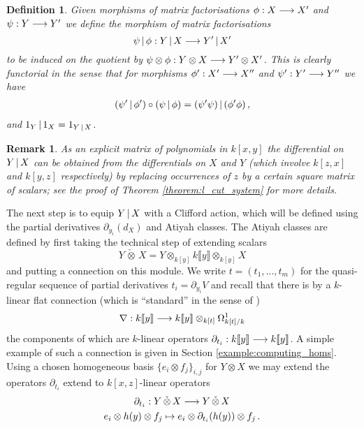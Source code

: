 \documentclass[english,letter paper,12pt,leqno]{article}
\theoremstyle{example}
\newtheorem{definition}[theorem]{Definition}
\newtheorem{remark}[theorem]{Remark}
\numberwithin{equation}{section}
\begin{document}
\begin{definition} Given morphisms of matrix factorisations $\phi: X \longrightarrow X'$ and $\psi: Y \longrightarrow Y'$ we define the morphism of matrix factorisations
\[
\psi \,|\, \phi: Y \,|\, X \longrightarrow Y' \,|\, X'
\]
to be induced on the quotient by $\psi \otimes \phi: Y \otimes X \longrightarrow Y' \otimes X'$. This is clearly functorial in the sense that for morphisms $\phi': X' \longrightarrow X''$ and $\psi': Y' \longrightarrow Y''$ we have
\begin{align}
( \psi' \,|\, \phi' ) \circ ( \psi \,|\, \phi ) = ( \psi' \psi ) \,|\, ( \phi' \phi )\,,
\end{align}
and $1_Y \,|\, 1_X = 1_{Y \,|\, X}$.
\end{definition}

\begin{remark}
As an explicit matrix of polynomials in $k[x,y]$ the differential on $Y \,|\, X$ can be obtained from the differentials on $X$ and $Y$ (which involve $k[z,x]$ and $k[y,z]$ respectively) by replacing occurrences of $z$ by a certain square matrix of scalars; see the proof of Theorem \ref{theorem:l_cut_system} for more details.
\end{remark}

The next step is to equip $Y \,|\, X$ with a Clifford action, which will be defined using the partial derivatives $\partial_{y_i}(d_X)$ and Atiyah classes. The Atiyah classes are defined by first taking the technical step of extending scalars
\begin{equation}\label{eq:completed_tensor_product}
Y \,\check{\otimes}\, X = Y \otimes_{k[y]} k\llbracket y \rrbracket \otimes_{k[y]} X
\end{equation}
and putting a connection on this module. We write $t = (t_1,\ldots,t_m)$ for the quasi-regular sequence of partial derivatives $t_i = \partial_{y_i} V$ and recall that there is by \cite[Appendix B]{dm1102.2957} a $k$-linear flat connection (which is ``standard'' in the sense of \cite[Definition 8.6]{dm1102.2957})
\begin{equation}\label{eq:connection_nabla}
\nabla: k\llbracket y \rrbracket \longrightarrow k\llbracket y \rrbracket \otimes_{k[t]} \Omega^1_{k[t]/k}
\end{equation}
the components of which are $k$-linear operators $\partial_{t_i}: k\llbracket y \rrbracket \longrightarrow k\llbracket y \rrbracket$. A simple example of such a connection is given in Section \ref{example:computing_homs}. Using a chosen homogeneous basis $\{ e_i \otimes f_j \}_{i,j}$ for $Y \otimes X$ we may extend the operators $\partial_{t_i}$ extend to $k[x,z]$-linear operators
\begin{gather*}
\partial_{t_i}: Y \, \check{\otimes}\, X \longrightarrow Y \, \check{\otimes}\, X\\
e_i \otimes h(y) \otimes f_j \mapsto e_i \otimes \partial_{t_i}( h(y) ) \otimes f_j\,.
\end{gather*}
\end{document}

